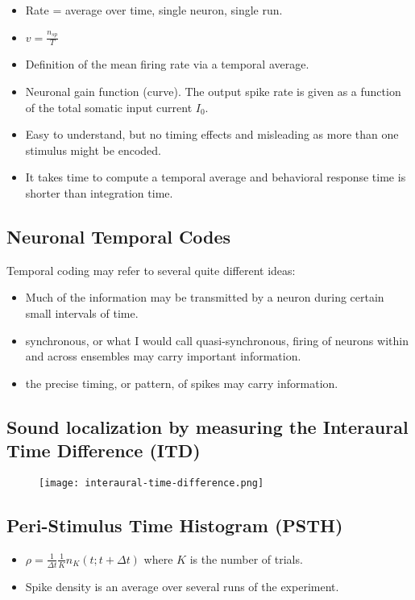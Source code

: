 \documentclass[main]{subfiles}
\begin{document}
\begin{itemize}[noitemsep,nolistsep]
	\item Rate = average over time, single neuron, single run.
	\item $v = \frac{n_{sp}}{T}$
	\item Definition of the mean firing rate via a temporal average.
	\item Neuronal gain function (curve). The output spike rate is given as a function of the total somatic input current $I_0$.
	\item Easy to understand, but no timing effects and misleading as more than one stimulus might be encoded.
	\item It takes time to compute a temporal average and behavioral response time is shorter than integration time.
\end{itemize}

\subsection{Neuronal Temporal Codes}
Temporal coding may refer to several quite different ideas:
\begin{itemize}
\item Much of the information may be transmitted by a neuron during certain small intervals of time.
\item synchronous, or what I would call quasi-synchronous, firing of neurons within and across ensembles may carry important information.
\item the precise timing, or pattern, of spikes may carry information.
\end{itemize}

\subsection{Sound localization by measuring  the Interaural Time Difference (ITD)}

\begin{figure}[H]
	\centering
	\texttt{[image: interaural-time-difference.png]}
\end{figure}

\subsection{Peri-Stimulus Time Histogram (PSTH)}
\begin{itemize}[noitemsep,nolistsep]
	\item $\rho = \frac{1}{\Delta t}\frac{1}{K}n_K(t;t+\Delta t)$ where $K$ is the number of trials.
	\item Spike density is an average over several runs of the experiment.
\end{itemize}
\end{document}
